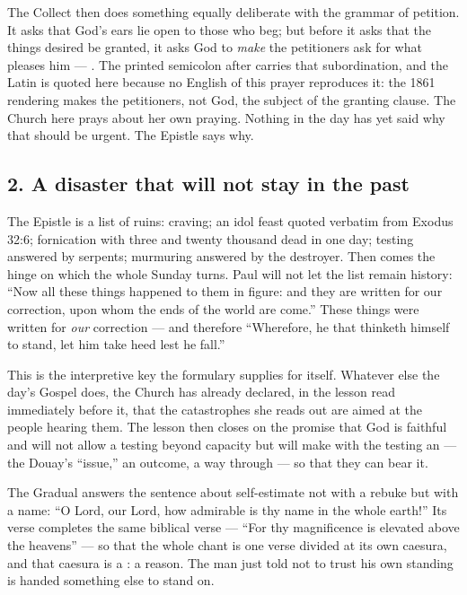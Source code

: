 The Collect then does something equally deliberate with the grammar of
petition. It asks that God's ears lie open to those who beg; but before it
asks that the things desired be granted, it asks God to \textit{make} the
petitioners ask for what pleases him --- . The printed semicolon after  carries that
subordination, and the Latin is quoted here because no English of this prayer
reproduces it: the 1861 rendering makes the petitioners, not God, the subject
of the granting clause. The Church here prays about her own praying. Nothing
in the day has yet said why that should be urgent. The Epistle says why.

\subsection*{2. A disaster that will not stay in the past}

The Epistle is a list of ruins: craving; an idol feast quoted verbatim from
Exodus 32:6; fornication with three and twenty thousand dead in one day;
testing answered by serpents; murmuring answered by the destroyer. Then comes
the hinge on which the whole Sunday turns. Paul will not let the list remain
history: ``Now all these things happened to them in figure: and they are
written for our correction, upon whom the ends of the world are come.'' These
things were written for \textit{our} correction --- and therefore
``Wherefore, he that thinketh himself to stand, let him take heed lest he
fall.''

This is the interpretive key the formulary supplies for itself. Whatever else
the day's Gospel does, the Church has already declared, in the lesson read
immediately before it, that the catastrophes she reads out are aimed at the
people hearing them. The lesson then closes on the promise that God is
faithful and will not allow a testing beyond capacity but will make with the
testing an  --- the Douay's ``issue,'' an outcome, a way
through --- so that they can bear it.

The Gradual answers the sentence about self-estimate not with a rebuke but
with a name: ``O Lord, our Lord, how admirable is thy name in the whole
earth!'' Its verse completes the same biblical verse --- ``For thy
magnificence is elevated above the heavens'' --- so that the whole chant is
one verse divided at its own caesura, and that caesura is a : a
reason. The man just told not to trust his own standing is handed something
else to stand on.

